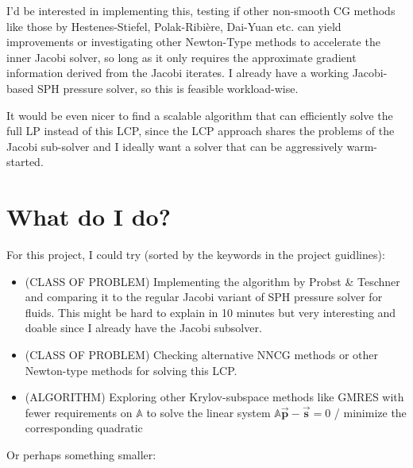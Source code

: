 \documentclass[oneside, a4paper]{book}
\newcommand\vek[1]{\vec{\bm{#1}}}
\newcommand\mat[1]{{\mathds{#1}}}
\begin{document}
I'd be interested in implementing this, testing if other non-smooth CG methods like those by \autocite{non-smooth-cg} Hestenes-Stiefel,  Polak-Ribière, Dai-Yuan etc. can yield improvements or investigating other Newton-Type methods to accelerate the inner Jacobi solver, so long as it only requires the approximate gradient information derived from the Jacobi iterates. I already have a working Jacobi-based SPH pressure solver, so this is feasible workload-wise.

It would be even nicer to find a scalable algorithm that can efficiently solve the full LP instead of this LCP, since the LCP approach shares the problems of the Jacobi sub-solver and I ideally want a solver that can be aggressively warm-started.

\section*{What do I do?}
For this project, I could try (sorted by the keywords in the project guidlines):
\begin{itemize}
    \item (CLASS OF PROBLEM) Implementing the algorithm by Probst \& Teschner and comparing it to the regular Jacobi variant of SPH pressure solver for fluids. This might be hard to explain in 10 minutes but very interesting and doable since I already have the Jacobi subsolver.
    \item (CLASS OF PROBLEM) Checking alternative NNCG methods or other Newton-type methods for solving this LCP.
    \item (ALGORITHM) Exploring other Krylov-subspace methods like GMRES with fewer requirements on $\mat{A}$ to solve the linear system $\mat{A}\vek{p}-\vek{s}=0$ / minimize the corresponding quadratic
\end{itemize}
Or perhaps something smaller:
\end{document}
